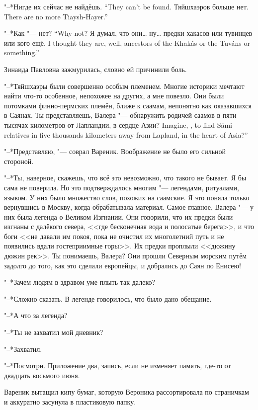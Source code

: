 {"--*Нигде их сейчас не найдёшь.}
{``They can't be found.}
{Тяйшхаэров больше нет.}
{There are no more Tiaysh-Hayer.''}

{"--*Как "--- нет?}
{``Why not?}
{Я думал, что они\dots{} ну\dots{} предки хакасов или тувинцев или кого ещё.}
{I thought they are, well, ancestors of the Khak\'as or the Tuv\'ans or something.''}

Зинаида Павловна зажмурилась, словно ей причинили боль.

"--*Тяйшхаэры были совершенно особым племенем.
Многие историки мечтают найти что-то особенное, непохожее на других, а мне повезло.
Они были потомками финно-пермских племён, ближе к саамам, непонятно как оказавшихся в Саянах.
{Ты представляешь, Валера "--- обнаружить родичей саамов в пяти тысячах километров от Лапландии, в сердце Азии?}
{Imagine, \Valera, to find S\'ami relatives in five thousands kilometers away from Lapland, in the heart of Asia?''}

"--*Представляю, "--- соврал Вареник.
Воображение не было его сильной стороной.

"--*Ты, наверное, скажешь, что всё это невозможно, что такого не бывает.
Я бы сама не поверила.
Но это подтверждалось многим "--- легендами, ритуалами, языком.
У них было множество слов, похожих на саамские.
Я это поняла только вернувшись в Москву, когда обрабатывала материал.
Самое главное, Валера "--- у них была легенда о Великом Изгнании.
Они говорили, что их предки были изгнаны с далёкого севера, <<где бесконечная вода и полосатые берега>>, и что боги <<не давали им покоя, пока не очистил их многолетний путь и не появились вдали гостеприимные горы>>.
Их предки проплыли <<дюжину дюжин рек>>.
Ты понимаешь, Валера?
Они прошли Северным морским путём задолго до того, как это сделали европейцы, и добрались до Саян по Енисею!

"--*Зачем людям в здравом уме плыть так далеко?

"--*Сложно сказать.
В легенде говорилось, что было дано обещание.

"--*А что за легенда?

"--*Ты не захватил мой дневник?

"--*Захватил.

"--*Посмотри.
Приложение два, запись, если не изменяет память, где-то от двадцать восьмого июня.

Вареник вытащил кипу бумаг, которую Вероника рассортировала по страничкам и аккуратно засунула в пластиковую папку.


